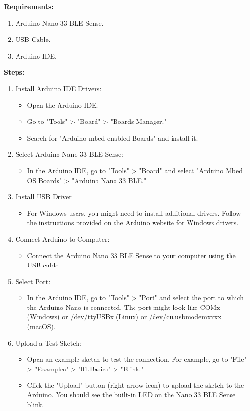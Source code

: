 \textbf{Requirements:}

\begin{enumerate}
	\item Arduino Nano 33 BLE Sense.
	\item USB Cable.
	\item Arduino IDE.
\end{enumerate}

\textbf{Steps:}

\begin{enumerate}
	\item Install Arduino IDE Drivers:
	\begin{itemize}
		\item Open the Arduino IDE.
		\item Go to "Tools" > "Board" > "Boards Manager."
		\item Search for "Arduino mbed-enabled Boards" and install it.
	\end{itemize}
	\item Select Arduino Nano 33 BLE Sense:
	\begin{itemize}
		\item In the Arduino IDE, go to "Tools" > "Board" and select "Arduino Mbed OS Boards" > "Arduino Nano 33 BLE."
	\end{itemize}
	\item Install USB Driver
	\begin{itemize}
		\item For Windows users, you might need to install additional drivers. Follow the instructions provided on the Arduino website for Windows drivers.
	\end{itemize}
	\item Connect Arduino to Computer:
	\begin{itemize}
		\item Connect the Arduino Nano 33 BLE Sense to your computer using the USB cable.
	\end{itemize}
	\item Select Port:
	\begin{itemize}
         \item In the Arduino IDE, go to "Tools" > "Port" and select the port to which the Arduino Nano is connected. The port might look like COMx (Windows) or /dev/ttyUSBx (Linux) or /dev/cu.usbmodemxxxx (macOS).
     \end{itemize}
     \item Upload a Test Sketch:
     \begin{itemize}
     	\item Open an example sketch to test the connection. For example, go to "File" > "Examples" > "01.Basics" > "Blink."
     	\item Click the "Upload" button (right arrow icon) to upload the sketch to the Arduino. You should see the built-in LED on the Nano 33 BLE Sense blink.
     \end{itemize}
 \end{enumerate}         





